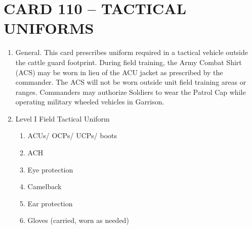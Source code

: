 \documentclass{article}
\begin{document}
\section*{CARD 110 – TACTICAL UNIFORMS}
\begin{enumerate}
    \item General. This card prescribes uniform required in a tactical vehicle outside the cattle guard footprint. During field training, the Army Combat Shirt (ACS) may be worn in lieu of the ACU jacket as prescribed by the commander. The ACS will not be worn outside unit field training areas or ranges. Commanders may authorize Soldiers to wear the Patrol Cap while operating military wheeled vehicles in Garrison.

\item Level I Field Tactical Uniform
\begin{enumerate}
    \item ACUs/ OCPs/ UCPs/ boots
	\item ACH
	\item Eye protection
	\item Camelback
	\item Ear protection
	\item Gloves (carried, worn as needed)
	\end{enumerate}


\end{enumerate}
\end{document}
